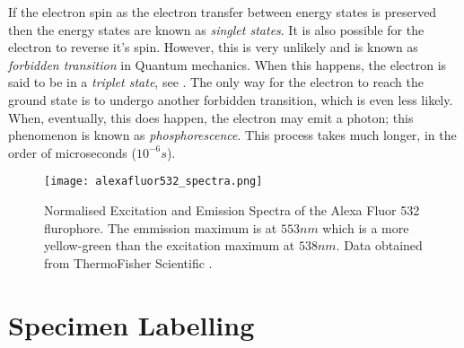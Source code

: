 

\begin{definition}
	If the electron spin as the electron transfer between energy states is preserved then the energy states are known as \textit{singlet states}.
	It is also possible for the electron to reverse it's spin.
	However, this is very unlikely and is known as \textit{forbidden transition} in Quantum mechanics.
	When this happens, the electron is said to be in a \textit{triplet state}, see .
	The only way for the electron to reach the ground state is to undergo another forbidden transition, which is even less likely.
	When, eventually, this does happen, the electron may emit a photon; this phenomenon is known as \textit{phosphorescence}.
	This process takes much longer, in the order of microseconds ($10^{-6}s$).
\end{definition}


\begin{figure}[!t]
	\centering
	\texttt{[image: alexafluor532\_spectra.png]}
	\caption{Normalised Excitation and Emission Spectra of the Alexa Fluor 532 flurophore.
	The emmission maximum is at $553nm$ which is a more yellow-green than the excitation maximum at $538nm$.
	Data obtained from ThermoFisher Scientific \citep{AlexaFluor532}.}
	\label{fig:excitationandemissionspectra}
\end{figure}


\section{Specimen Labelling}
\label{sec:SpecimenLabelling}

